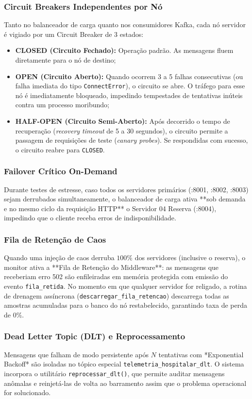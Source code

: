 \documentclass[12pt,a4paper]{article}
\begin{document}
\subsubsection{Circuit Breakers Independentes por Nó}
Tanto no balanceador de carga quanto nos consumidores Kafka, cada nó servidor é vigiado por um Circuit Breaker de 3 estados:
\begin{itemize}
	\item \textbf{CLOSED (Circuito Fechado):} Operação padrão. As mensagens fluem diretamente para o nó de destino;
	\item \textbf{OPEN (Circuito Aberto):} Quando ocorrem 3 a 5 falhas consecutivas (ou falha imediata do tipo \texttt{ConnectError}), o circuito se abre. O tráfego para esse nó é imediatamente bloqueado, impedindo tempestades de tentativas inúteis contra um processo moribundo;
	\item \textbf{HALF-OPEN (Circuito Semi-Aberto):} Após decorrido o tempo de recuperação (\textit{recovery timeout} de 5 a 30 segundos), o circuito permite a passagem de requisições de teste (\textit{canary probes}). Se respondidas com sucesso, o circuito reabre para \texttt{CLOSED}.
\end{itemize}

\subsubsection{Failover Crítico On-Demand}
Durante testes de estresse, caso todos os servidores primários (:8001, :8002, :8003) sejam derrubados simultaneamente, o balanceador de carga ativa **sob demanda e no mesmo ciclo da requisição HTTP** o Servidor 04 Reserva (:8004), impedindo que o cliente receba erros de indisponibilidade.

\subsubsection{Fila de Retenção de Caos}
Quando uma injeção de caos derruba $100\%$ dos servidores (inclusive o reserva), o monitor ativa a **Fila de Retenção do Middleware**: as mensagens que receberiam erro 502 são enfileiradas em memória protegida com emissão do evento \texttt{fila\_retida}. No momento em que qualquer servidor for religado, a rotina de drenagem assíncrona (\texttt{descarregar\_fila\_retencao}) descarrega todas as amostras acumuladas para o banco do nó restabelecido, garantindo taxa de perda de $0\%$.

\subsubsection{Dead Letter Topic (DLT) e Reprocessamento}
Mensagens que falham de modo persistente após $N$ tentativas com *Exponential Backoff* são isoladas no tópico especial \texttt{telemetria\_hospitalar\_dlt}. O sistema incorpora o utilitário \texttt{reprocessar\_dlt()}, que permite auditar mensagens anômalas e reinjetá-las de volta ao barramento assim que o problema operacional for solucionado.
\end{document}
